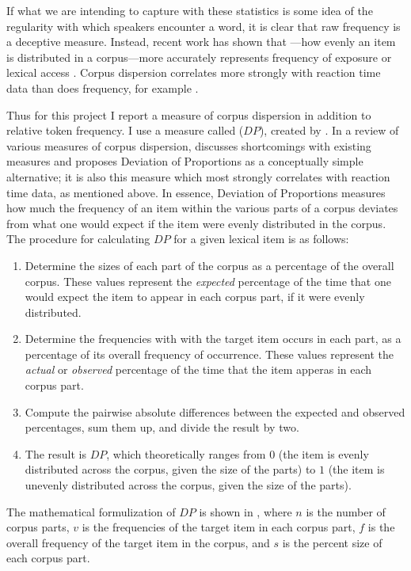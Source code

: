 If what we are intending to capture with these statistics is some idea of the regularity with which speakers encounter a word, it is clear that raw frequency is a deceptive measure. Instead, recent work has shown that —how evenly an item is distributed in a corpus—more accurately represents frequency of exposure or lexical access \parencites{Gries2008}{Gries2010}{Griesfc}. Corpus dispersion correlates more strongly with reaction time data than does frequency, for example \parencite{Griesfc}.

Thus for this project I report a measure of corpus dispersion in addition to relative token frequency. I use a measure called  ($DP$), created by \textcite{Gries2008}. In a review of various measures of corpus dispersion, \textcite{Gries2008} discusses shortcomings with existing measures and proposes Deviation of Proportions as a conceptually simple alternative; it is also this measure which most strongly correlates with reaction time data, as mentioned above. In essence, Deviation of Proportions measures how much the frequency of an item within the various parts of a corpus deviates from what one would expect if the item were evenly distributed in the corpus. The procedure for calculating $DP$ for a given lexical item is as follows:

\begin{enumerate}
  \item Determine the sizes of each part of the corpus as a percentage of the overall corpus. These values represent the \emph{expected} percentage of the time that one would expect the item to appear in each corpus part, if it were evenly distributed.
  \item Determine the frequencies with with the target item occurs in each part, as a percentage of its overall frequency of occurrence. These values represent the \emph{actual} or \emph{observed} percentage of the time that the item apperas in each corpus part.
  \item Compute the pairwise absolute differences between the expected and observed percentages, sum them up, and divide the result by two.
  \item The result is $DP$, which theoretically ranges from $0$ (the item is evenly distributed across the corpus, given the size of the parts) to $1$ (the item is unevenly distributed across the corpus, given the size of the parts).
\end{enumerate}

\noindent The mathematical formulization of $DP$ is shown in , where $n$ is the number of corpus parts, $v$ is the frequencies of the target item in each corpus part, $f$ is the overall frequency of the target item in the corpus, and $s$ is the percent size of each corpus part.

